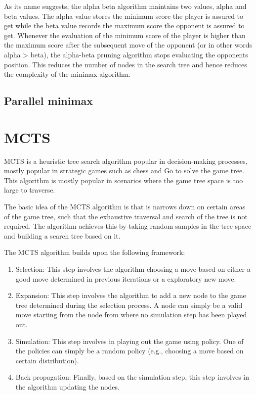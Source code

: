 As its name suggests, the alpha beta algorithm maintains two values, alpha and beta values. The alpha value stores the minimum score the player is assured to get while the beta value records the maximum score the opponent is assured to get. Whenever the evaluation of the minimum score of the player is higher than the maximum score after the subsequent move of the opponent (or in other words alpha > beta), the alpha-beta pruning algorithm stops evaluating the opponents position. This reduces the number of nodes in the search tree and hence reduces the complexity of the minimax algorithm.



\subsection{Parallel minimax}

 
\section{\ac{MCTS}}

\ac{MCTS} \cite{Coulom2006Efficient} is a heuristic tree search algorithm popular in decision-making processes, mostly popular in strategic games such as chess and Go to solve the game tree. This algorithm is mostly popular in scenarios where the game tree space is too large to traverse. 

The basic idea of the \ac{MCTS} algorithm is that is narrows down on certain areas of the game tree, such that the exhaustive traversal and search of the tree is not required. The algorithm achieves this by taking random samples in the tree space and building a search tree based on it.

The \ac{MCTS} algorithm builds upon the following framework:
\begin{enumerate}
    \item Selection: This step involves the algorithm choosing a move based on either a good move determined in previous iterations or a exploratory new move.
    \item Expansion: This step involves the algorithm to add a new node to the game tree determined during the selection process. A node can simply be a valid move starting from the node from where no simulation step has been played out. 
    \item Simulation: This step involves in playing out the game using policy. One of the policies can simply be a random policy (e.g., choosing a move based on certain distribution).
    \item Back propagation: Finally, based on the simulation step, this step involves in the algorithm updating the nodes.
\end{enumerate}

